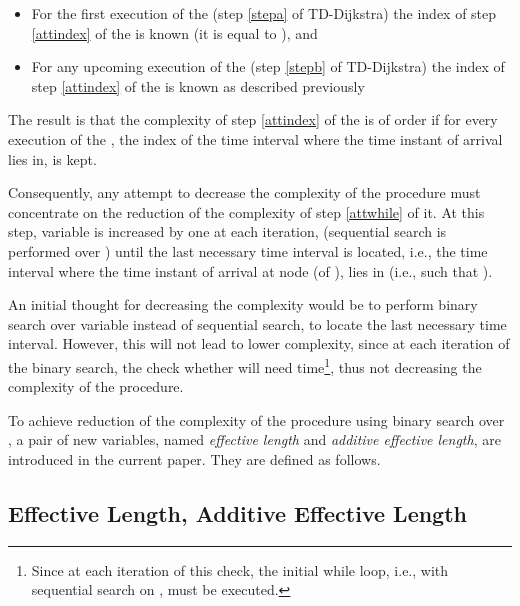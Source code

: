 \documentclass[conference]{IEEEtran}
\begin{document}
\begin{itemize}
    \item For the first execution of the  (step \ref{stepa} of TD-Dijkstra) the index  of step \ref{attindex} of the  is known (it is equal to ), and
    \item For any upcoming execution of the  (step \ref{stepb} of TD-Dijkstra) the index  of step \ref{attindex} of the  is known as described previously
\end{itemize}

The result is that the complexity of step \ref{attindex} of the  is of order  if for every execution of the , the index of the time interval where the time instant of arrival lies in, is kept.

Consequently, any attempt to decrease the complexity of the  procedure must concentrate on the reduction of the complexity of step \ref{attwhile} of it. At this step, variable  is increased by one at each iteration, (sequential search is performed over ) until the last necessary time interval is located, i.e., the time interval where the time instant of arrival  at node  (of ), lies in (i.e.,  such that ). 

An initial thought for decreasing the complexity would be to perform binary search \cite{ahuja} over variable   instead of sequential search, to locate the last necessary time interval. However, this will not lead to lower complexity, since at each iteration of the binary search, the check whether  will need  time\footnote{Since at each iteration of this check,  the initial while loop, i.e.,  with sequential search on , must be executed.}, thus not decreasing the complexity of the  procedure. 

To achieve reduction of the complexity of the  procedure using binary search over , a pair of new variables, named \emph{effective length} and \emph{additive effective length}, are introduced in the current paper. They are defined as follows.


\subsection{Effective Length, Additive Effective Length}
\end{document}
